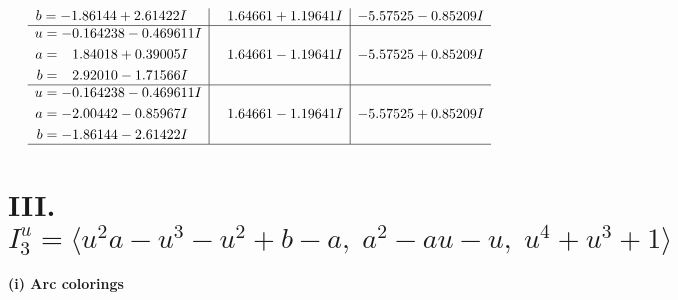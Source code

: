 \documentclass[1p]{elsarticle_modified}
\theoremstyle{definition}
\begin{document}
$$\begin{array}{c|c|c}
\begin{aligned}
b &= -1.86144 + 2.61422 I\end{aligned}
 & \phantom{-}1.64661 + 1.19641 I & -5.57525 - 0.85209 I \\ \hline\begin{aligned}
u &= -0.164238 - 0.469611 I \\
a &= \phantom{-}1.84018 + 0.39005 I \\
b &= \phantom{-}2.92010 - 1.71566 I\end{aligned}
 & \phantom{-}1.64661 - 1.19641 I & -5.57525 + 0.85209 I \\ \hline\begin{aligned}
u &= -0.164238 - 0.469611 I \\
a &= -2.00442 - 0.85967 I \\
b &= -1.86144 - 2.61422 I\end{aligned}
 & \phantom{-}1.64661 - 1.19641 I & -5.57525 + 0.85209 I\\
 \hline 
 \end{array}$$\newpage\newpage\renewcommand{\arraystretch}{1}
\centering \section*{III. $I^u_{3}= \langle u^2 a- u^3- u^2+b- a,\;a^2- a u- u,\;u^4+u^3+1 \rangle$}
\flushleft \textbf{(i) Arc colorings}\\
\end{document}

